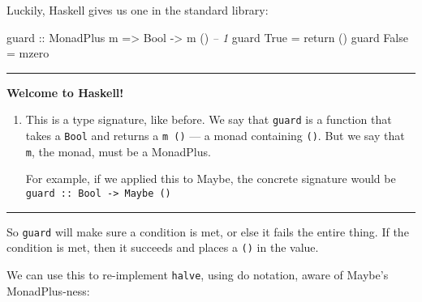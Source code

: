 \documentclass[]{article}
\newenvironment{Shaded}{}{}
\newcommand{\KeywordTok}[1]{\textcolor[rgb]{0.00,0.44,0.13}{\textbf{{#1}}}}
\newcommand{\DataTypeTok}[1]{\textcolor[rgb]{0.56,0.13,0.00}{{#1}}}
\newcommand{\DecValTok}[1]{\textcolor[rgb]{0.25,0.63,0.44}{{#1}}}
\newcommand{\CommentTok}[1]{\textcolor[rgb]{0.38,0.63,0.69}{\textit{{#1}}}}
\newcommand{\OtherTok}[1]{\textcolor[rgb]{0.00,0.44,0.13}{{#1}}}
\newcommand{\FunctionTok}[1]{\textcolor[rgb]{0.02,0.16,0.49}{{#1}}}
\newcommand{\NormalTok}[1]{{#1}}
\begin{document}
Luckily, Haskell gives us one in the standard library:

\begin{Shaded}
\begin{Highlighting}[]
\OtherTok{guard ::} \DataTypeTok{MonadPlus} \NormalTok{m }\OtherTok{=>} \DataTypeTok{Bool} \OtherTok{->} \NormalTok{m ()        }\CommentTok{-- 1}
\NormalTok{guard }\DataTypeTok{True}  \FunctionTok{=} \NormalTok{return ()}
\NormalTok{guard }\DataTypeTok{False} \FunctionTok{=} \NormalTok{mzero}
\end{Highlighting}
\end{Shaded}

\begin{center}\rule{0.5\linewidth}{\linethickness}\end{center}

\textbf{Welcome to Haskell!}

\begin{enumerate}
\def\labelenumi{\arabic{enumi}.}
\item
  This is a type signature, like before. We say that \texttt{guard} is a
  function that takes a \texttt{Bool} and returns a \texttt{m\ ()} --- a
  monad containing \texttt{()}. But we say that \texttt{m}, the monad,
  must be a MonadPlus.

  For example, if we applied this to Maybe, the concrete signature would
  be \texttt{guard\ ::\ Bool\ -\textgreater{}\ Maybe\ ()}
\end{enumerate}

\begin{center}\rule{0.5\linewidth}{\linethickness}\end{center}

So \texttt{guard} will make sure a condition is met, or else it fails
the entire thing. If the condition is met, then it succeeds and places a
\texttt{()} in the value.

We can use this to re-implement \texttt{halve}, using do notation, aware
of Maybe's MonadPlus-ness:

\begin{Shaded}
\end{Shaded}
\end{document}
